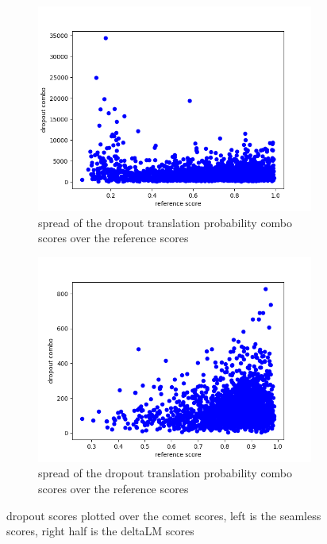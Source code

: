 \begin{figure}[h]
\begin{subfigure}{0.4\linewidth}
        \includegraphics[width=\textwidth]{Latex/sections/images/seamlessdropoutcombo.png}
        \caption{spread of the dropout translation probability combo scores over the reference scores}
    \end{subfigure}
    \begin{subfigure}{0.4\linewidth}
        \includegraphics[width=\textwidth]{Latex/sections/images/dlmdropoutcombo.png}
        \caption{spread of the dropout translation probability combo scores over the reference scores}
    \end{subfigure}
    \caption{dropout scores plotted over the comet scores, left is the seamless scores, right half is the deltaLM scores}
    \label{fig:dropout translation}
\end{figure}

